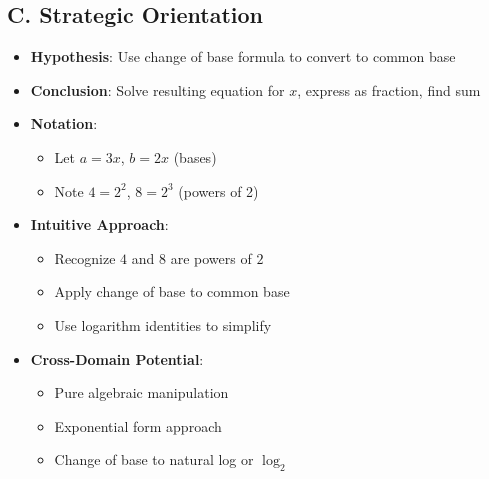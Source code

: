 \documentclass[12pt]{article}
\begin{document}
\begin{problemconfigbox}
\subsection*{C. Strategic Orientation}
\begin{itemize}[leftmargin=*]
    \item \textbf{Hypothesis}: Use change of base formula to convert to common base
    \item \textbf{Conclusion}: Solve resulting equation for $x$, express as fraction, find sum
    \item \textbf{Notation}: 
    \begin{itemize}
        \item Let $a = 3x$, $b = 2x$ (bases)
        \item Note $4 = 2^2$, $8 = 2^3$ (powers of 2)
    \end{itemize}
    \item \textbf{Intuitive Approach}: 
    \begin{itemize}
        \item Recognize $4$ and $8$ are powers of $2$
        \item Apply change of base to common base
        \item Use logarithm identities to simplify
    \end{itemize}
    \item \textbf{Cross-Domain Potential}: 
    \begin{itemize}
        \item Pure algebraic manipulation
        \item Exponential form approach
        \item Change of base to natural log or $\log_2$
    \end{itemize}
\end{itemize}
\end{problemconfigbox}
\end{document}
